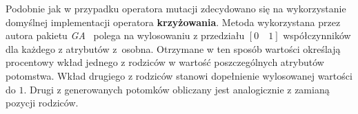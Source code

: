 \par
Podobnie jak w przypadku operatora mutacji zdecydowano się na wykorzystanie domyślnej implementacji operatora \textbf{krzyżowania}. Metoda wykorzystana przez autora pakietu \emph{GA}~\cite{gaPackage} polega na wylosowaniu z przedziału $[0\quad1]$ współczynników dla każdego z atrybutów z~osobna. Otrzymane w ten sposób wartości określają procentowy wkład jednego z rodziców w wartość poszczególnych atrybutów potomstwa. Wkład drugiego z rodziców stanowi dopełnienie wylosowanej wartości do $1$. Drugi z generowanych potomków obliczany jest analogicznie z zamianą pozycji rodziców. 

